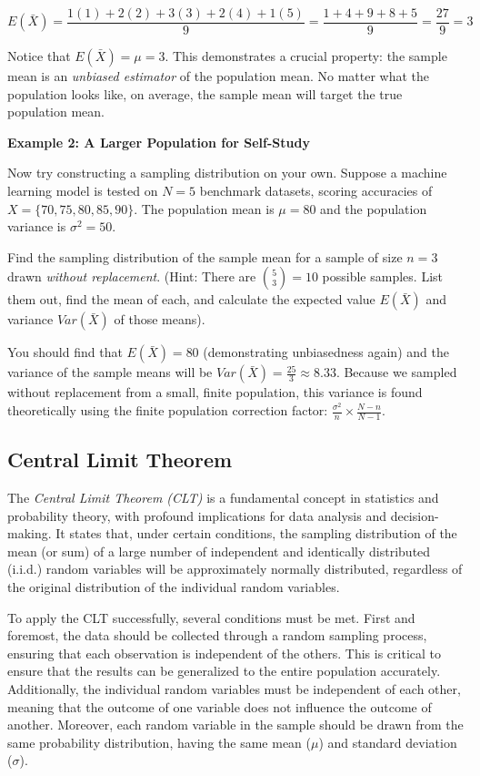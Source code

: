 \documentclass{article}
\begin{document}
$$E(\bar{X})=\frac{1(1)+2(2)+3(3)+2(4)+1(5)}{9}=\frac{1+4+9+8+5}{9}=\frac{27}{9}=3$$

Notice that $E(\bar{X})=\mu=3$. This demonstrates a crucial property: the sample mean is an \emph{unbiased estimator} of the population mean. No matter what the population looks like, on average, the sample mean will target the true population mean.

\textbf{Example 2: A Larger Population for Self-Study}

Now try constructing a sampling distribution on your own. Suppose a machine learning model is tested on $N=5$ benchmark datasets, scoring accuracies of $X=\{70,75,80,85,90\}$. The population mean is $\mu=80$ and the population variance is $\sigma^2=50$.

Find the sampling distribution of the sample mean for a sample of size $n=3$ drawn \emph{without replacement}. (Hint: There are $\binom{5}{3}=10$ possible samples. List them out, find the mean of each, and calculate the expected value $E(\bar{X})$ and variance $Var(\bar{X})$ of those means).

You should find that $E(\bar{X})=80$ (demonstrating unbiasedness again) and the variance of the sample means will be $Var(\bar{X})=\frac{25}{3}\approx8.33$. Because we sampled without replacement from a small, finite population, this variance is found theoretically using the finite population correction factor: $\frac{\sigma^2}{n}\times\frac{N-n}{N-1}$.

\subsection{Central Limit Theorem}

The \emph{Central Limit Theorem (CLT)} is a fundamental concept in statistics and probability theory, with profound implications for data analysis and decision-making. It states that, under certain conditions, the sampling distribution of the mean (or sum) of a large number of independent and identically distributed (i.i.d.) random variables will be approximately normally distributed, regardless of the original distribution of the individual random variables.

To apply the CLT successfully, several conditions must be met. First and foremost, the data should be collected through a random sampling process, ensuring that each observation is independent of the others. This is critical to ensure that the results can be generalized to the entire population accurately. Additionally, the individual random variables must be independent of each other, meaning that the outcome of one variable does not influence the outcome of another. Moreover, each random variable in the sample should be drawn from the same probability distribution, having the same mean ($\mu$) and standard deviation ($\sigma$).
\end{document}
